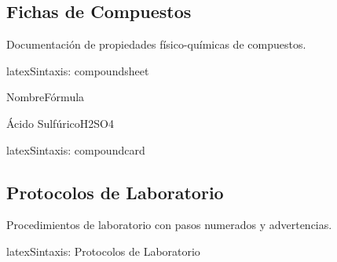 \subsection{Fichas de Compuestos}
\label{subsec:compuestos}

Documentación de propiedades físico-químicas de compuestos.


\begin{codigosimple}{latex}{Sintaxis: compoundsheet}
\begin{compoundsheet}{Nombre}{Fórmula}
\end{compoundsheet}
\end{codigosimple}

\begin{compoundsheet}{Ácido Sulfúrico}{H2SO4}
\end{compoundsheet}


\begin{codigosimple}{latex}{Sintaxis: compoundcard}
\end{codigosimple}

\vspace{1em}
\noindent
{}
\hfill
{}

\subsection{Protocolos de Laboratorio}
\label{subsec:protocolos}

Procedimientos de laboratorio con pasos numerados y advertencias.

\begin{codigosimple}{latex}{Sintaxis: Protocolos de Laboratorio}
\begin{protocol}[Título]
\end{protocol}
\end{codigosimple}

